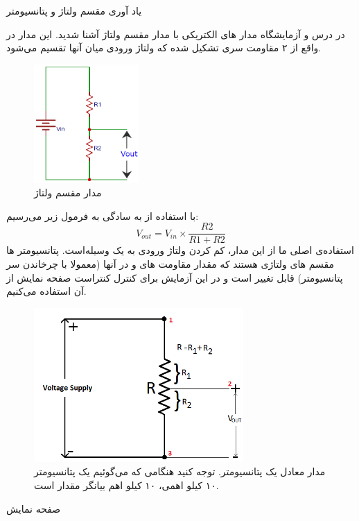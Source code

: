 \begin{nas}یاد آوری مقسم ولتاژ و پتانسیومتر\end{nas}
\newline
در درس و آزمایشگاه مدار های الکتریکی با مدار مقسم ولتاژ آشنا شدید. این مدار در واقع از ۲ مقاومت سری تشکیل شده که ولتاژ ورودی میان آنها تقسیم می‌شود.
\newline
\begin{figure}[h]
    \centering
    \includegraphics[width=4cm]{vdiv.png}
    \caption{مدار مقسم ولتاژ}
    \label{fig:voldiv}
\end{figure}
\newline
با استفاده از  به سادگی به فرمول زیر می‌رسیم:
\begin{equation}V_{out} = V_{in} \times \frac{R2}{R1 + R2}\end{equation}
استفاده‌ی اصلی ما از این مدار، کم کردن ولتاژ ورودی به یک وسیله‌است. پتانسیومتر ها مقسم های ولتاژی هستند که مقدار مقاومت های  و در آنها (معمولا با چرخاندن سر پتانسیومتر) قابل تغییر است و در این آزمایش برای کنترل کنتراست صفحه نمایش از آن استفاده می‌کنیم.
\newline
\begin{figure}[h]
    \centering
    \includegraphics[width=8cm]{pot.png}
    \caption{مدار معادل یک پتانسیومتر. توجه کنید هنگامی که می‌گوئیم یک پتانسیومتر ۱۰ کیلو اهمی، ۱۰ کیلو اهم بیانگر مقدار  است.}
    \label{fig:pot-circ}
\end{figure}
\newline
\begin{nas}صفحه نمایش \end{nas}
